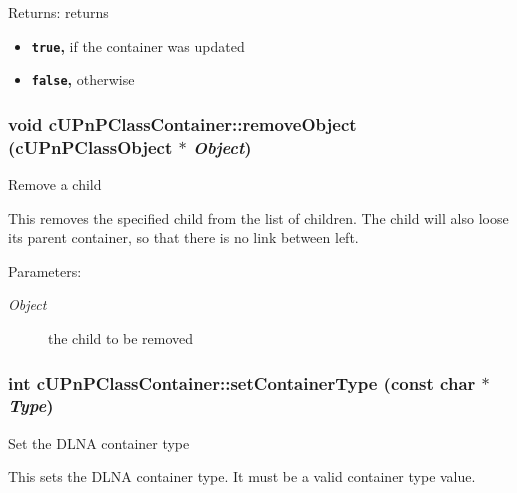 \begin{Desc}
\item[Returns:]returns\begin{itemize}
\item {\bf {\tt true},} if the container was updated\item {\bf {\tt false},} otherwise \end{itemize}
\end{Desc}
\hypertarget{classcUPnPClassContainer_2e3110bd01c17df34cd60302d9330e72}{
\subsubsection[{removeObject}]{\setlength{\rightskip}{0pt plus 5cm}void cUPnPClassContainer::removeObject ({\bf cUPnPClassObject} $\ast$ {\em Object})}}
\label{classcUPnPClassContainer_2e3110bd01c17df34cd60302d9330e72}


Remove a child

This removes the specified child from the list of children. The child will also loose its parent container, so that there is no link between left.

\begin{Desc}
\item[Parameters:]
\begin{description}
\item[{\em Object}]the child to be removed \end{description}
\end{Desc}
\hypertarget{classcUPnPClassContainer_495f4218ec9566ede534a96daf387462}{
\subsubsection[{setContainerType}]{\setlength{\rightskip}{0pt plus 5cm}int cUPnPClassContainer::setContainerType (const char $\ast$ {\em Type})}}
\label{classcUPnPClassContainer_495f4218ec9566ede534a96daf387462}


Set the DLNA container type

This sets the DLNA container type. It must be a valid container type value.

